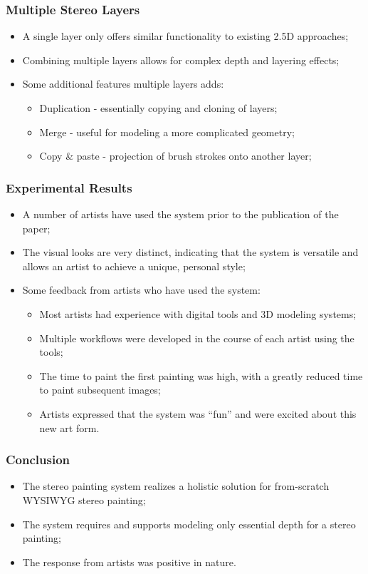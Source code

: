 \documentclass{beamer}
\begin{document}
\begin{frame}
    \frametitle{Multiple Stereo Layers}
    \begin{itemize}
        \item A single layer only offers similar functionality to existing 2.5D
        approaches;
        \item Combining multiple layers allows for complex depth and layering
        effects;
        \item Some additional features multiple layers adds:
        \begin{itemize}
            \item Duplication - essentially copying and cloning of layers;
            \item Merge - useful for modeling a more complicated geometry;
            \item Copy \& paste - projection of brush strokes onto another
            layer;
        \end{itemize}
    \end{itemize}
\end{frame}

\begin{frame}
    \frametitle{Experimental Results}
    \begin{itemize}
        \item A number of artists have used the system prior to the publication
        of the paper;
        \item The visual looks are very distinct, indicating that the system is
        versatile and allows an artist to achieve a unique, personal style;
        \item Some feedback from artists who have used the system:
        \begin{itemize}
            \item Most artists had experience with digital tools and 3D modeling
            systems;
            \item Multiple workflows were developed in the course of each artist
            using the tools;
            \item The time to paint the first painting was high, with a greatly
            reduced time to paint subsequent images;
            \item Artists expressed that the system was ``fun'' and were excited
            about this new art form.
        \end{itemize}
    \end{itemize}
\end{frame}

\begin{frame}
    \frametitle{Conclusion}
    \begin{itemize}
        \item The stereo painting system realizes a holistic solution for
        from-scratch WYSIWYG stereo painting;
        \item The system requires and supports modeling only essential depth for
        a stereo painting;
        \item The response from artists was positive in nature.
    \end{itemize}
\end{frame}
\end{document}
